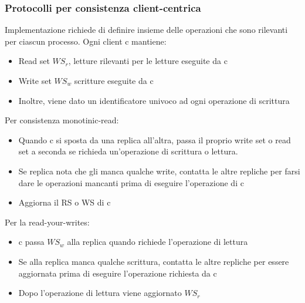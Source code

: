 \documentclass[16px]{article}
\begin{document}
\subsubsection{Protocolli per consistenza client-centrica}
Implementazione richiede di definire insieme delle operazioni che sono rilevanti per ciascun processo. Ogni client c mantiene:
\begin{itemize}
\item Read set $WS_r$, letture rilevanti per le letture eseguite da c
\item Write set $WS_w$ scritture eseguite da c
\item Inoltre, viene dato un identificatore univoco ad ogni operazione di scrittura
\end{itemize}
Per consistenza monotinic-read:
\begin{itemize}
\item Quando c si sposta da una replica all'altra, passa il proprio write set o read set a seconda se richieda un'operazione di scrittura o lettura.
\item Se replica nota che gli manca qualche write, contatta le altre repliche per farsi dare le operazioni mancanti prima di eseguire l'operazione di c
\item Aggiorna il RS o WS di c
\end{itemize}
Per la read-your-writes:
\begin{itemize}
\item c passa $WS_w$ alla replica quando richiede l'operazione di lettura
\item Se alla replica manca qualche scrittura, contatta le altre repliche per essere aggiornata prima di eseguire l'operazione richiesta da c
\item Dopo l'operazione di lettura viene aggiornato $WS_r$
\end{itemize}
\end{document}
